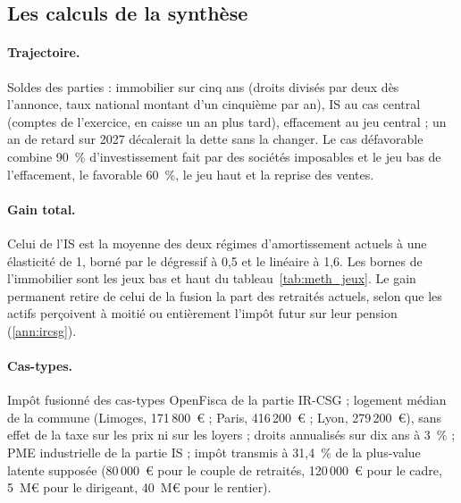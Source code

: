 \subsection{Les calculs de la synthèse}\label{ann:meth_synthese}

\paragraph{Trajectoire.} Soldes des parties : immobilier sur cinq ans (droits divisés par deux dès l'annonce, taux
national montant d'un cinquième par an), IS au cas central (comptes de l'exercice, en caisse un an plus tard),
effacement au jeu central ; un an de retard sur 2027 décalerait la dette sans la changer. Le cas défavorable combine
90~\% d'investissement fait par des sociétés imposables et le jeu bas de l'effacement, le favorable 60~\%, le jeu haut
et la reprise des ventes.

\paragraph{Gain total.} Celui de l'IS est la moyenne des deux régimes d'amortissement actuels à une élasticité de 1,
borné par le dégressif à 0,5 et le linéaire à 1,6. Les bornes de l'immobilier sont les jeux bas et haut du
tableau~\ref{tab:meth_jeux}. Le gain permanent retire de celui de la fusion la part des retraités actuels, selon que
les actifs perçoivent à moitié ou entièrement l'impôt futur sur leur pension (\ref{ann:ircsg}).

\paragraph{Cas-types.} Impôt fusionné des cas-types OpenFisca de la partie IR-CSG ; logement médian de la commune
(Limoges, 171\,800~€ ; Paris, 416\,200~€ ; Lyon, 279\,200~€), sans effet de la taxe sur les prix ni sur les loyers ;
droits annualisés sur dix ans à 3~\% ; PME industrielle de la partie IS ; impôt transmis à 31,4~\% de la plus-value
latente supposée (80\,000~€ pour le couple de retraités, 120\,000~€ pour le cadre, 5~M€ pour le dirigeant, 40~M€ pour
le rentier).

